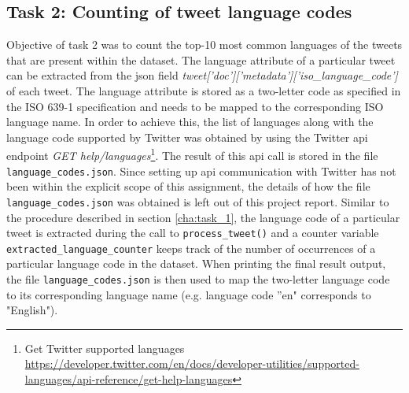 \documentclass[paper=a4, fontsize=11pt]{scrartcl}
\numberwithin{equation}{section}		%
\numberwithin{figure}{section}			%
\numberwithin{table}{section}				%
\begin{document}
\subsection{Task 2: Counting of tweet language codes} 
\label{cha:task_2}
Objective of task 2 was to count the top-10 most common languages of the tweets that are present within the dataset. The language attribute of a particular tweet can be extracted from the \acrshort{json} field \emph{tweet['doc']['metadata']['iso\_language\_code']} of each tweet. The language attribute is stored as a two-letter code as specified in the ISO 639-1 specification \citep{RN311} and needs to be mapped to the corresponding ISO language name. 
\newline
In order to achieve this, the list of languages along with the language code supported by Twitter was obtained by using the Twitter \acrfull{api} endpoint \emph{GET help/languages}\footnote{Get Twitter supported languages \url{https://developer.twitter.com/en/docs/developer-utilities/supported-languages/api-reference/get-help-languages}}. The result of this \acrshort{api} call is stored in the file \texttt{language\_codes.json}. Since setting up \acrshort{api} communication with Twitter has not been within the explicit scope of this assignment, the details of how the file \texttt{language\_codes.json} was obtained is left out of this project report.
\newline
Similar to the procedure described in section \ref{cha:task_1}, the language code of a particular tweet is extracted during the call to \texttt{process\_tweet()} and a counter variable \texttt{extracted\_language\_counter} keeps track of the number of occurrences of a particular language code in the dataset. When printing the final result output, the file \texttt{language\_codes.json} is then used to map the two-letter language code to its corresponding language name (e.g.  language code ''en" corresponds to "English").
\end{document}
